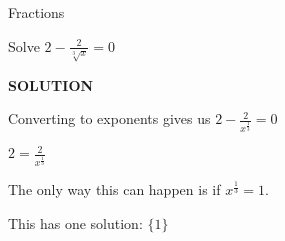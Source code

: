 \documentclass{ximera}
\begin{document}
\begin{example}  Fractions


Solve $2 - \frac{2}{\sqrt[3]{x}} = 0$



\textbf{\textcolor{purple!50!blue!90!black}{SOLUTION}}


Converting to exponents gives us $2 - \frac{2}{x^{\tfrac{1}{3}}} = 0$


$2 = \frac{2}{x^{\tfrac{1}{3}}}$

The only way this can happen is if $x^{\tfrac{1}{3}} = 1$.

This has one solution: $\{  1  \}$








\end{example}
\end{document}
